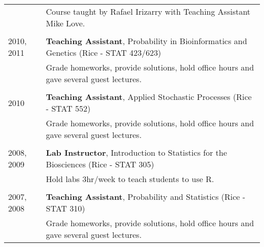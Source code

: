 \documentclass[10pt]{article}
\begin{document}
\begin{table}[h]
\begin{tabular}{ll}
& Course taught by Rafael Irizarry with Teaching Assistant Mike Love. \\
& \\
2010, 2011 & \textbf{Teaching Assistant}, Probability in Bioinformatics and Genetics (Rice - STAT 423/623)   \\
& Grade homeworks, provide solutions, hold office hours and gave several guest lectures.  \\
& \\
2010 & \textbf{Teaching Assistant}, Applied Stochastic Processes (Rice - STAT 552)   \\
& Grade homeworks, provide solutions, hold office hours and gave several guest lectures. \\
& \\
2008, 2009 & \textbf{Lab Instructor}, Introduction to Statistics for the Biosciences (Rice - STAT 305)   \\
 & Hold labs 3hr/week to teach students to use R. \\
& \\
2007, 2008 & \textbf{Teaching Assistant}, Probability and Statistics (Rice - STAT 310)   \\
& Grade homeworks, provide solutions, hold office hours and gave several guest lectures. 
\end{tabular}
\end{table}


\end{document}
